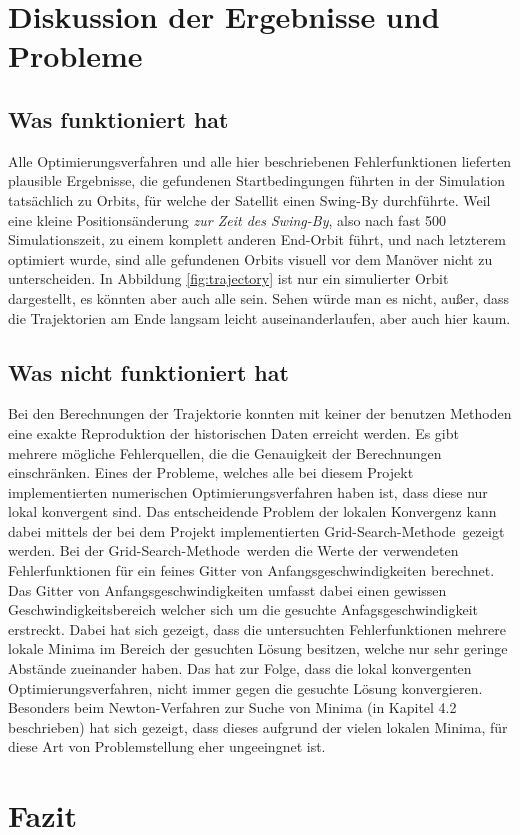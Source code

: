\section{Diskussion der Ergebnisse und Probleme}

\subsection{Was funktioniert hat}

Alle Optimierungsverfahren und alle hier beschriebenen Fehlerfunktionen lieferten plausible Ergebnisse, die gefundenen Startbedingungen führten in der Simulation tatsächlich zu Orbits, für welche der Satellit einen Swing-By durchführte. Weil eine kleine Positionsänderung \textit{zur Zeit des Swing-By}, also nach fast 500 Simulationszeit, zu einem komplett anderen End-Orbit führt, und nach letzterem optimiert wurde, sind alle gefundenen Orbits visuell vor dem Manöver nicht zu unterscheiden. In Abbildung \ref{fig:trajectory} ist nur ein simulierter Orbit dargestellt, es könnten aber auch alle sein. Sehen würde man es nicht, außer, dass die Trajektorien am Ende langsam leicht auseinanderlaufen, aber auch hier kaum.


\subsection{Was nicht funktioniert hat}

Bei den Berechnungen der Trajektorie konnten mit keiner der benutzen Methoden eine exakte Reproduktion der historischen Daten erreicht werden. Es gibt mehrere mögliche Fehlerquellen, die die Genauigkeit der Berechnungen einschränken. Eines der Probleme, welches alle bei diesem Projekt implementierten numerischen Optimierungsverfahren haben ist, dass diese nur lokal konvergent sind. Das entscheidende  Problem der lokalen Konvergenz kann dabei mittels der bei dem Projekt implementierten \glqq Grid-Search-Methode\grqq\, gezeigt werden. Bei der \glqq Grid-Search-Methode\grqq\, werden die Werte der verwendeten Fehlerfunktionen für ein feines Gitter von Anfangsgeschwindigkeiten berechnet. Das Gitter von Anfangsgeschwindigkeiten umfasst dabei einen gewissen Geschwindigkeitsbereich welcher sich um die gesuchte Anfagsgeschwindigkeit erstreckt. Dabei hat sich gezeigt, dass die untersuchten Fehlerfunktionen mehrere lokale Minima im Bereich der gesuchten Lösung besitzen, welche nur sehr geringe Abstände zueinander haben. Das hat zur Folge, dass die lokal konvergenten Optimierungsverfahren, nicht immer gegen die gesuchte Lösung konvergieren. Besonders beim Newton-Verfahren zur Suche von Minima (in Kapitel 4.2 beschrieben) hat sich gezeigt, dass dieses aufgrund der vielen lokalen Minima, für diese Art von Problemstellung eher ungeeingnet ist.

\section{Fazit}




